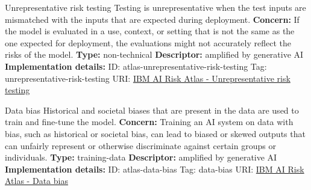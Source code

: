 \begin{definitionbox}{Unrepresentative risk testing}
Testing is unrepresentative when the test inputs are mismatched with the inputs that are expected during deployment.\newline\newline
\textbf{Concern: }If the model is evaluated in a use, context, or setting that is not the same as the one expected for deployment, the evaluations might not accurately reflect the risks of the model.\newline\newline
\textbf{Type: }non-technical\newline
\textbf{Descriptor: }amplified by generative AI \newline\newline
\textbf{Implementation details: } \newline
ID: atlas-unrepresentative-risk-testing \newline
Tag: unrepresentative-risk-testing \newline
URI:  \href{https://www.ibm.com/docs/en/watsonx/saas?topic=SSYOK8/wsj/ai-risk-atlas/unrepresentative-risk-testing.html}{IBM AI Risk Atlas - Unrepresentative risk testing}\newline
\end{definitionbox}
\begin{definitionbox}{Data bias}
Historical and societal biases that are present in the data are used to train and fine-tune the model.\newline\newline
\textbf{Concern: }Training an AI system on data with bias, such as historical or societal bias, can lead to biased or skewed outputs that can unfairly represent or otherwise discriminate against certain groups or individuals.\newline\newline
\textbf{Type: }training-data\newline
\textbf{Descriptor: }amplified by generative AI \newline\newline
\textbf{Implementation details: } \newline
ID: atlas-data-bias \newline
Tag: data-bias \newline
URI:  \href{https://www.ibm.com/docs/en/watsonx/saas?topic=SSYOK8/wsj/ai-risk-atlas/data-bias.html}{IBM AI Risk Atlas - Data bias}\newline
\end{definitionbox}
